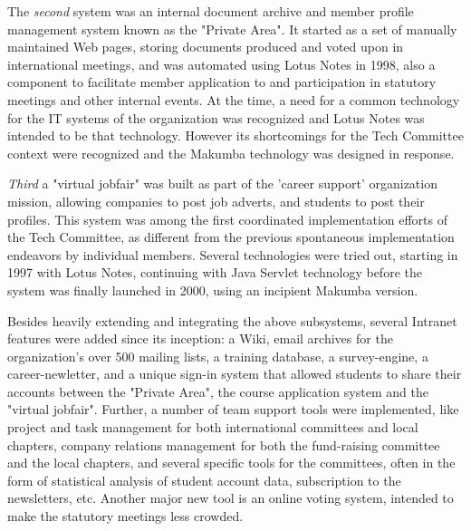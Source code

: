 \documentclass{llncs}
\begin{document}
The {\it second} system was an internal document archive and member profile management system known as the "Private Area". It started as a set of manually maintained Web pages, storing documents produced and voted upon in international meetings, and was automated using Lotus Notes in 1998, also a component to facilitate member application to and participation in statutory meetings and other internal events. At the time, a need for a common technology for the IT systems of the organization was recognized and Lotus Notes was intended to be that technology. However its shortcomings for the Tech Committee context were recognized and the Makumba technology was designed in response.

{\it Third} a "virtual jobfair" was built as part of the 'career support' organization mission, allowing companies to post job adverts, and students to post their profiles. This system was among the first coordinated implementation efforts of the Tech Committee, as different from the previous spontaneous implementation endeavors by individual members. Several technologies were tried out, starting in 1997 with Lotus Notes, continuing with Java Servlet technology before the system was finally launched in 2000, using an incipient Makumba version.

Besides heavily extending and integrating the above subsystems, several Intranet features were added since its inception: a Wiki, email archives for the organization's over 500 mailing lists, a training database, a survey-engine, a career-newletter, and a unique sign-in system that allowed students to share their accounts between the "Private Area", the course application system and the "virtual jobfair". Further, a number of team support tools were implemented, like project and task management for both international committees and local chapters, company relations management for both the fund-raising committee and the local chapters, and several specific tools for the committees, often in the form of statistical analysis of student account data, subscription to the newsletters, etc. Another major new tool is an online voting system, intended to make the statutory meetings less crowded.
\end{document}
